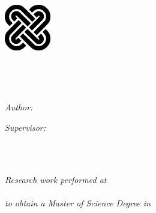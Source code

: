 \begin{center}
	
	\vspace{2.2cm}
	\begin{center}
		
		\includegraphics[height=20mm]{./inputs/01_Cover_Page/solomon}
		\vspace{4mm}
		
		
	\end{center}
	
	\HRule \\[0.4cm] %
	{\huge \bfseries \ThesisTitle \par}\vspace{0.4cm} 
	\HRule \\[0.8cm] %
	
	\begin{minipage}[t]{0.4\textwidth}
		\begin{flushleft} 	\large
			\emph{Author:}	\\
			\AuthorName 		
		\end{flushleft}
	\end{minipage}
	\begin{minipage}[t]{0.4\textwidth}
		\begin{flushright} \large
			\emph{Supervisor:} \\
			\SupervisorName 	\\
			\CoSupervisorName 
		\end{flushright}
	\end{minipage}\\
	
	\vspace{1.4cm}
	
	\large \textit{Research work performed at}\\[0.3cm]
	\href{\GroupLink}{\GroupName}\\[0.3cm] 
	 \textit{to obtain a Master of Science Degree in} \\[0.3cm]
	 {\FontMb{\MasterDegree}}
	\vfill
	

\end{center}
